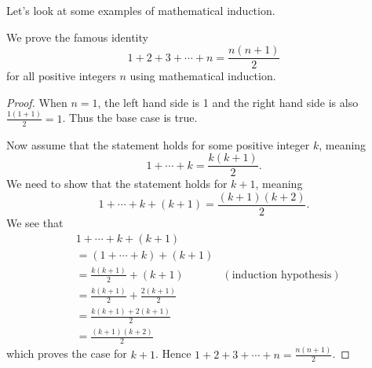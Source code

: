 Let's look at some examples of mathematical induction.

\begin{example}
    \setlength{\parindent}{1.5em}

    We prove the famous identity
    \[
        1 + 2 + 3 + \cdots + n = \frac{n(n+1)}2
    \]
    for all positive integers $n$ using mathematical induction.
    \begin{proof}
        When $n = 1$, the left hand side is 1 and the right hand side is also $\frac{1(1+1)}{2} = 1$. Thus the base case is true.

        Now assume that the statement holds for some positive integer $k$, meaning
        \[
            1 + \cdots + k = \frac{k(k+1)}2.
        \]
        We need to show that the statement holds for $k+1$, meaning
        \[
            1 + \cdots + k + (k+1) = \frac{(k+1)(k+2)}2.
        \]
        We see that
        \begin{align*}
            &1 + \cdots + k + (k+1) \\
            &= (1 + \cdots + k) + (k+1)\\
            &= \frac{k(k+1)}{2} + (k+1) & (\text{induction hypothesis})\\
            &= \frac{k(k+1)}2 + \frac{2(k+1)}{2}\\
            &= \frac{k(k+1) + 2(k+1)}2\\
            &= \frac{(k+1)(k+2)}2
        \end{align*}
        which proves the case for $k + 1$. Hence $1 + 2 + 3 + \cdots + n = \frac{n(n+1)}2$.
    \end{proof}
\end{example}

